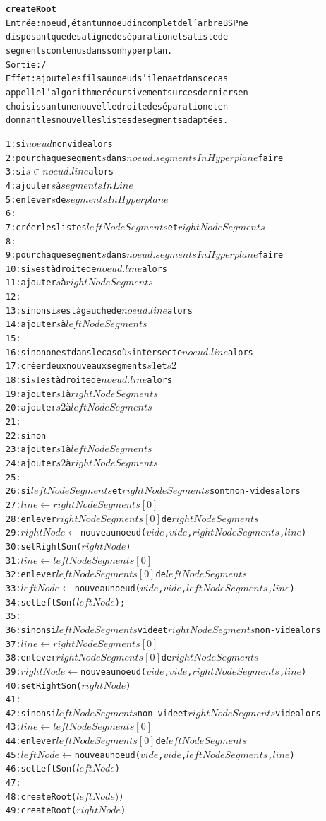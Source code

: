 \documentclass[11pt,a4paper]{article}
\theoremstyle{definition}
\theoremstyle{remark}
\begin{document}
\begin{alltt}
\textbf{createRoot}
Entrée : noeud, étant un noeud incomplet de l'arbre BSP ne
disposant que de sa ligne de séparation et sa liste de
segments contenus dans son hyperplan.
Sortie : /
Effet : ajoute les fils au noeud s'il en a et dans ce cas 
appelle l'algorithme récursivement sur ces derniers en 
choisissant une nouvelle droite de séparation et en 
donnant les nouvelles listes de segments adaptées.

 1: si \(noeud\) non vide alors
 2:   pour chaque segment \(s\) dans \(noeud.segmentsInHyperplane\) faire
 3:     si \(s \in noeud.line\) alors
 4:       ajouter \(s\) à \(segmentsInLine\)
 5:       enlever \(s\) de \(segmentsInHyperplane\)
 6:       
 7:   créer les listes \(leftNodeSegments\) et \(rightNodeSegments\)
 8:   
 9:   pour chaque segment \(s\) dans \(noeud.segmentsInHyperplane\) faire
10:     si \(s\) est à droite de \(noeud.line\) alors
11:       ajouter \(s\) à \(rightNodeSegments\)
12:
13:     sinon si \(s\) est à gauche de \(noeud.line\) alors
14:       ajouter \(s\) à \(leftNodeSegments\)
15:
16:     sinon on est dans le cas où \(s\) intersecte \(noeud.line\) alors
17:       créer deux nouveaux segments \(s1\) et \(s2\)
18:       si \(s1\) est à droite de \(noeud.line\) alors
19:         ajouter \(s1\) à \(rightNodeSegments\)
20:         ajouter \(s2\) à \(leftNodeSegments\)
21:
22:       sinon
23:         ajouter \(s1\) à \(leftNodeSegments\)
24:         ajouter \(s2\) à \(rightNodeSegments\)
25:         
26:   si \(leftNodeSegments\) et \(rightNodeSegments\) sont non-vides alors
27:     \(line \leftarrow rightNodeSegments[0]\)
28:     enlever \(rightNodeSegments[0]\) de \(rightNodeSegments\)
29:     \(rightNode \leftarrow\) nouveau noeud (\(vide\), \(vide\), \(rightNodeSegments\), \(line\))
30:     setRightSon(\(rightNode\))
31:     \(line \leftarrow leftNodeSegments[0]\)
32:     enlever \(leftNodeSegments[0]\) de \(leftNodeSegments\)
33:     \(leftNode \leftarrow\) nouveau noeud (\(vide\), \(vide\), \(leftNodeSegments\), \(line\))
34:     setLeftSon(\(leftNode\));
35:     
36:   sinon si \(leftNodeSegments\) vide et \(rightNodeSegments\) non-vide alors
37:     \(line \leftarrow rightNodeSegments[0]\)
38:     enlever \(rightNodeSegments[0]\) de \(rightNodeSegments\)
39:     \(rightNode \leftarrow \) nouveau noeud (\(vide\), \(vide\), \(rightNodeSegments\), \(line\))
40:     setRightSon(\(rightNode\))
41:    
42:   sinon si \(leftNodeSegments\) non-vide et \(rightNodeSegments\) vide alors
43:     \(line \leftarrow leftNodeSegments[0]\)
44:     enlever \(leftNodeSegments[0]\) de \(leftNodeSegments\)
45:     \(leftNode \leftarrow \) nouveau noeud (\(vide\), \(vide\), \(leftNodeSegments\), \(line\))
46:     setLeftSon(\(leftNode\))
47:     
48:   createRoot(\(leftNode)\))
49:   createRoot(\(rightNode\))
\end{alltt}
\end{document}
